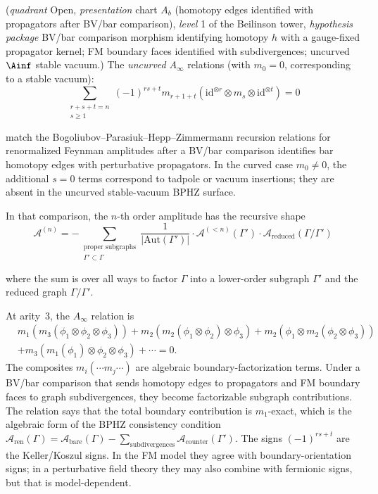 \begin{conjecture}[BPHZ recursion = \texorpdfstring{$A_\infty$}{A-infinity} consistency; \ClaimStatusConjectured]
\label{conj:v1-bphz-recursion}
\textup{(}\emph{quadrant} Open, \emph{presentation} chart $A_b$
\textup{(}homotopy edges identified with propagators after BV/bar
comparison\textup{)}, \emph{level} 1 of the Beilinson tower,
\emph{hypothesis package} BV/bar comparison morphism identifying
homotopy $h$ with a gauge-fixed propagator kernel; FM boundary faces
identified with subdivergences; uncurved $\Ainf$ stable
vacuum.\textup{)}
The \emph{uncurved} $A_\infty$ relations (with $m_0 = 0$, corresponding to a stable vacuum):
\[\sum_{\substack{r+s+t=n \\ s \geq 1}} (-1)^{rs+t} m_{r+1+t}(\mathrm{id}^{\otimes r} \otimes m_s \otimes
\mathrm{id}^{\otimes t}) = 0\]

match the Bogoliubov--Parasiuk--Hepp--Zimmermann recursion relations
for renormalized Feynman amplitudes after a BV/bar comparison identifies
bar homotopy edges with perturbative propagators.  In the curved case
$m_0\neq 0$, the additional $s=0$ terms correspond to tadpole or vacuum
insertions; they are absent in the uncurved stable-vacuum BPHZ surface.

In that comparison, the $n$-th order amplitude has the recursive shape
\[\mathcal{A}^{(n)} = -\sum_{\substack{\text{proper subgraphs} \\ \Gamma' \subset \Gamma}}
\frac{1}{|\text{Aut}(\Gamma')|} \cdot \mathcal{A}^{(<n)}(\Gamma') \cdot
\mathcal{A}_{\text{reduced}}(\Gamma/\Gamma')\]

where the sum is over all ways to factor $\Gamma$ into a lower-order subgraph $\Gamma'$
and the reduced graph $\Gamma/\Gamma'$.
\end{conjecture}

\begin{remark}
At arity~$3$, the $A_\infty$ relation is
\begin{align*}
&m_1(m_3(\phi_1 \otimes \phi_2 \otimes \phi_3))
+ m_2(m_2(\phi_1 \otimes \phi_2) \otimes \phi_3)
+ m_2(\phi_1 \otimes m_2(\phi_2 \otimes \phi_3)) \\
&+ m_3(m_1(\phi_1) \otimes \phi_2 \otimes \phi_3) + \cdots = 0.
\end{align*}
The composites $m_i(\cdots m_j \cdots)$ are algebraic
boundary-factorization terms. Under a BV/bar comparison that sends
homotopy edges to propagators and FM boundary faces to graph
subdivergences, they become factorizable subgraph contributions. The
relation says that the total boundary contribution is $m_1$-exact,
which is the algebraic form of the BPHZ consistency condition
$\mathcal{A}_{\text{ren}}(\Gamma)
= \mathcal{A}_{\text{bare}}(\Gamma)
- \sum_{\text{subdivergences}} \mathcal{A}_{\text{counter}}(\Gamma')$.
The signs $(-1)^{rs+t}$ are the Keller/Koszul signs.  In the FM model
they agree with boundary-orientation signs; in a perturbative field
theory they may also combine with fermionic signs, but that is
model-dependent.
\end{remark}

